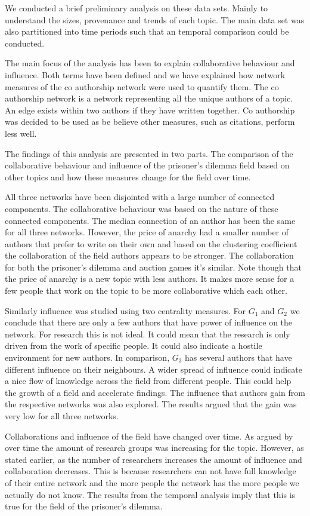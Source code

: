 \documentclass{article}
\theoremstyle{definition}
\begin{document}
We conducted a brief preliminary analysis on these data sets. Mainly to understand
the sizes, provenance and trends of each topic. The main data set was also partitioned
into time periods such that an temporal comparison could be conducted.

The main focus of the analysis has been to explain collaborative behaviour and
influence. Both terms have been defined and we have explained how network measures
of the co authorship network were used to quantify them. The co authorship
network is a network representing all the unique authors of a topic. An edge
exists within two authors if they have written together. Co authorship was
decided to be used as be believe other measures, such as citations, perform less
well.

The findings of this analysis are presented in two parts. The comparison of the
collaborative behaviour and influence of the prisoner's dilemma field based on
other topics and how these measures change for the field over time.

All three networks have been disjointed with a large number of connected components.
The collaborative behaviour was based on the nature of these connected components.
The median connection of an author has been the same for all three networks.
However, the price of anarchy had a smaller number of authors that prefer to write
on their own and based on the clustering coefficient the collaboration of the
field authors appears to be stronger. The collaboration for both the prisoner's
dilemma and auction games it's similar. Note though that the price of anarchy
is a new topic with less authors. It makes more sense for a few people that
work on the topic to be more collaborative which each other.

Similarly influence was studied using two centrality measures. For \(G_1\) and
\(G_2\) we conclude that there are only a few authors that have power of influence
on the network. For research this is not ideal. It could mean that the research
is only driven from the work of specific people. It could also indicate a hostile
environment for new authors. In comparison, \(G_3\) has several authors that have
different influence on their neighbours. A wider spread of influence could indicate
a nice flow of knowledge across the field from different people. This could
help the growth of a field and accelerate findings. The influence that authors
gain from the respective networks was also explored. The results argued that
the gain was very low for all three networks.

Collaborations and influence of the field have changed over time. As argued
by~\cite{Etzkowitz1992} over time the amount of research groups was increasing
for the topic. However, as stated earlier, as the number of researchers increases
the amount of influence and collaboration decreases. This is because researchers
can not have full knowledge of their entire network and the more people the network
has the more people we actually do not know. The results from the temporal
analysis imply that this is true for the field of the prisoner's dilemma.


\newpage


\end{document}
